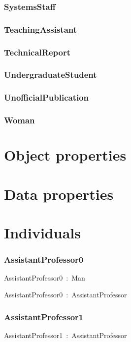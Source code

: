 \documentclass{article}
\begin{document}
\subsubsection*{SystemsStaff}

\subsubsection*{TeachingAssistant}

\subsubsection*{TechnicalReport}

\subsubsection*{UndergraduateStudent}

\subsubsection*{UnofficialPublication}

\subsubsection*{Woman}

\section*{Object properties}\section*{Data properties}\section*{Individuals}\subsubsection*{AssistantProfessor0}

AssistantProfessor0~:~Man

AssistantProfessor0~:~AssistantProfessor

\subsubsection*{AssistantProfessor1}

AssistantProfessor1~:~AssistantProfessor
\end{document}
